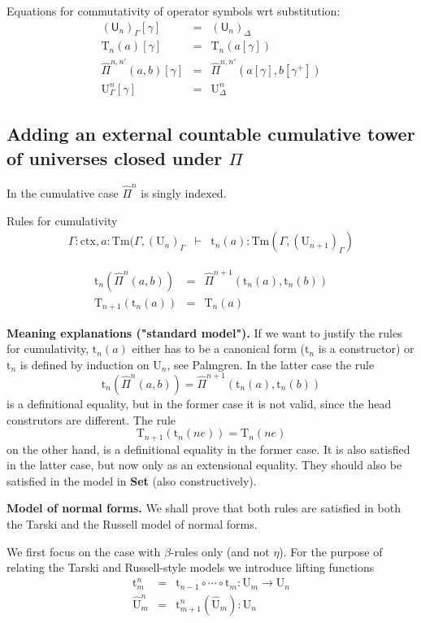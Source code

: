 \documentclass{lmcs}
\def\UU{\mathrm{U}}
\def\Ta{\mathrm{T}}
\def\Pihat{\hat{\Pi}}
\def\UUhat{\hat{\UU}}
\def\t{\mathrm{t}}
\def\Tm{\mathrm{Tm}}
\newcommand{\ctx}{\mathrm{ctx}}
\def\U{\mathsf{U}}
\begin{document}
 Equations for commutativity of operator symbols wrt substitution:
 \begin{eqnarray*}
{(\U_n)}_\Gamma [ \gamma ] &=& {(\U_n)}_\Delta\\
\Ta_n(a) [ \gamma ] &=& \Ta_n(a[ \gamma ] )\\
\Pihat^{n,n'}(a,b)[ \gamma ] &=& \Pihat^{n,n'}(a [ \gamma ], b[ \gamma^+ ])\\
\UU^n_\Gamma [ \gamma ] &=& \UU^n_\Delta
\end{eqnarray*}

\subsection{Adding an external countable cumulative tower of universes closed under $\Pi$}

In the cumulative case $\Pihat^n$ is singly indexed.

Rules for cumulativity
\begin{eqnarray*}
\Gamma : \ctx, a : \Tm(\Gamma,(\UU_{n})_\Gamma &\vdash& \t_n(a) : \Tm(\Gamma,(\UU_{n+1})_\Gamma)
\end{eqnarray*}

\begin{eqnarray*}
\t_n(\Pihat^n(a,b)) &=& \Pihat^{n+1}(\t_n(a),\t_n(b))\\ 
\Ta_{n+1}(\t_n(a)) &=& \Ta_n(a)
\end{eqnarray*}

{\bf Meaning explanations ("standard model").} If we want to justify the rules for cumulativity, $\t_n(a)$ either has to be a canonical form ($\t_n$ is a constructor) or $\t_n$ is defined by induction on $\UU_n$, see Palmgren. In the latter case the rule 
$$\t_n(\Pihat^n(a,b)) = \Pihat^{n+1}(\t_n(a),\t_n(b))$$ is a definitional equality, but in the former case it is not valid, since the head construtors are different. The rule 
$$\Ta_{n+1}(\t_n(ne)) = \Ta_n(ne)$$ on the other hand, is a definitional equality in the former case. It is also satisfied in the latter case, but now only as an extensional equality. They should also be satisfied in the model in {\bf Set} (also constructively).

{\bf Model of normal forms.}
We shall prove that both rules are satisfied in both the Tarski and the Russell model of normal forms. 

We first focus on the case with $\beta$-rules only (and not $\eta$). For the purpose of relating the Tarski and Russell-style models we introduce lifting functions
\begin{eqnarray*}
\t^n_m &=& \t_{n-1} \circ \cdots \circ \t_m : \UU_m \to \UU_n\\
\UUhat^n_m &=& \t^n_{m+1}(\UUhat_m) : \UU_n
\end{eqnarray*}
\end{document}

